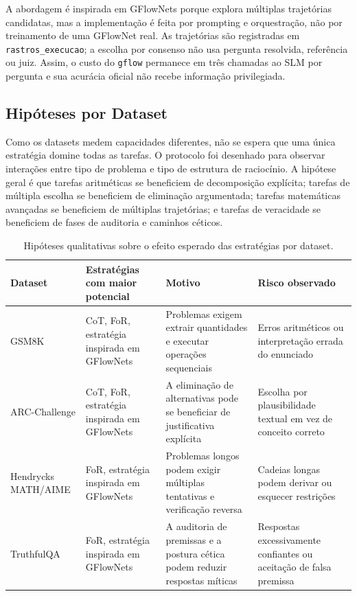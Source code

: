 \documentclass[12pt]{article}
\begin{document}
A abordagem é inspirada em GFlowNets porque explora múltiplas trajetórias candidatas, mas a implementação é feita por prompting e orquestração, não por treinamento de uma GFlowNet real. As trajetórias são registradas em \texttt{rastros\_execucao}; a escolha por consenso não usa pergunta resolvida, referência ou juiz. Assim, o custo do \texttt{gflow} permanece em três chamadas ao SLM por pergunta e sua acurácia oficial não recebe informação privilegiada.

\subsection{Hipóteses por Dataset}

Como os datasets medem capacidades diferentes, não se espera que uma única estratégia domine todas as tarefas. O protocolo foi desenhado para observar interações entre tipo de problema e tipo de estrutura de raciocínio. A hipótese geral é que tarefas aritméticas se beneficiem de decomposição explícita; tarefas de múltipla escolha se beneficiem de eliminação argumentada; tarefas matemáticas avançadas se beneficiem de múltiplas trajetórias; e tarefas de veracidade se beneficiem de fases de auditoria e caminhos céticos.

\begin{table}[ht]
\centering
\small
\caption{Hipóteses qualitativas sobre o efeito esperado das estratégias por dataset.}
\label{tab:hipoteses}
\begin{tabular}{|p{2.5cm}|p{3.3cm}|p{3.2cm}|p{3.2cm}|}
\hline
\textbf{Dataset} & \textbf{Estratégias com maior potencial} & \textbf{Motivo} & \textbf{Risco observado} \\
\hline
GSM8K & CoT, FoR, estratégia inspirada em GFlowNets & Problemas exigem extrair quantidades e executar operações sequenciais & Erros aritméticos ou interpretação errada do enunciado \\
\hline
ARC-Challenge & CoT, FoR, estratégia inspirada em GFlowNets & A eliminação de alternativas pode se beneficiar de justificativa explícita & Escolha por plausibilidade textual em vez de conceito correto \\
\hline
Hendrycks MATH/AIME & FoR, estratégia inspirada em GFlowNets & Problemas longos podem exigir múltiplas tentativas e verificação reversa & Cadeias longas podem derivar ou esquecer restrições \\
\hline
TruthfulQA & FoR, estratégia inspirada em GFlowNets & A auditoria de premissas e a postura cética podem reduzir respostas míticas & Respostas excessivamente confiantes ou aceitação de falsa premissa \\
\hline
\end{tabular}
\end{table}
\end{document}
